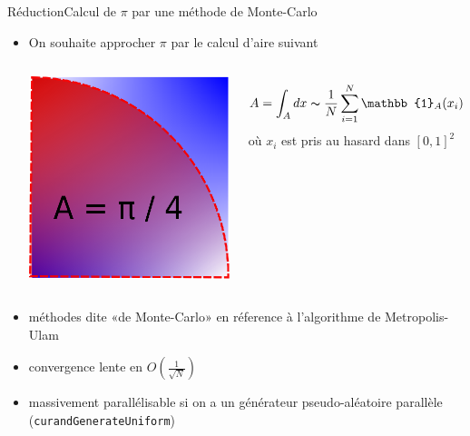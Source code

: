 \documentclass[11pt,mathserif]{beamer}
\newcommand{\argi}{\faLightbulbO}
\newcommand{\pozik}{\faSmileO}
\newcommand{\triste}{\faFrownO}
\begin{document}
\begin{frame}{Réduction}{Calcul de $\pi$ par une méthode de Monte-Carlo}
 \begin{itemize}[<+->]
   \item[\argi] On souhaite approcher $\pi$ par le calcul d'aire suivant
     \begin{columns}
       \column{5cm}
\begin{center}
  \includegraphics[width=0.5\linewidth]{fig/monteCarlo.eps}
\end{center}
       \column{5cm}
  $$A = \int_{A} dx \thicksim \frac{1}{N}\sum_{i=1}^N \mathbb{1}_{A}(x_i)$$
 où $x_i$ est pris au hasard dans $[0,1]^2$
     \end{columns}
  \item[\faBomb] méthodes dite «de Monte-Carlo» en réference à l'algorithme de Metropolis-Ulam
  \item[\triste] convergence lente en $O(\frac{1}{\sqrt{N}})$
  \item[\pozik] massivement parallélisable si on a un générateur pseudo-aléatoire parallèle (\texttt{curandGenerateUniform})
  \end{itemize}
\end{frame}
\end{document}
